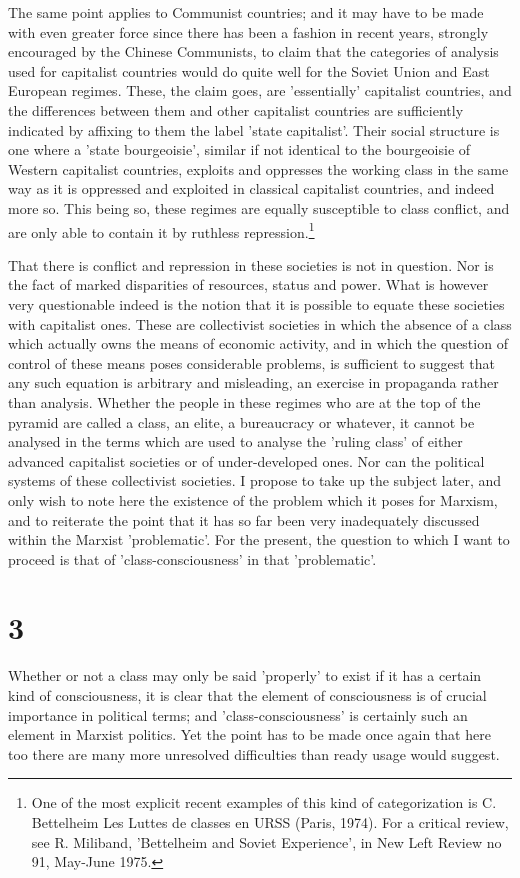 The same point applies to Communist countries; and it may have to be made with even greater force since there has been a fashion in recent years, strongly encouraged by the Chinese Communists, to claim that the categories of analysis used for capitalist countries would do quite well for the Soviet Union and East European regimes. These, the claim goes, are 'essentially' capitalist countries, and the differences between them and other capitalist countries are sufficiently indicated by affixing to them the label 'state capitalist'. Their social structure is one where a 'state bourgeoisie', similar if not identical to the bourgeoisie of Western capitalist countries, exploits and oppresses the working class in the same way as it is oppressed and exploited in classical capitalist countries, and indeed more so. This being so, these regimes are equally susceptible to class conflict, and are only able to contain it by ruthless repression.\footnote{One of the most explicit recent examples of this kind of categorization is C. Bettelheim Les Luttes de classes en URSS (Paris, 1974). For a critical review, see R. Miliband, 'Bettelheim and Soviet Experience', in New Left Review no 91, May-June 1975.}

That there is conflict and repression in these societies is not in question. Nor is the fact of marked disparities of resources, status and power. What is however very questionable indeed is the notion that it is possible to equate these societies with capitalist ones. These are collectivist societies in which the absence of a class which actually owns the means of economic activity, and in which the question of control of these means poses considerable problems, is sufficient to suggest that any such equation is arbitrary and misleading, an exercise in propaganda rather than analysis. Whether the people in these regimes who are at the top of the pyramid are called a class, an elite, a bureaucracy or whatever, it cannot be analysed in the terms which are used to analyse the 'ruling class' of either advanced capitalist societies or of under-developed ones. Nor can the political systems of these collectivist societies. I propose to take up the subject later, and only wish to note here the existence of the problem which it poses for Marxism, and to reiterate the point that it has so far been very inadequately discussed within the Marxist 'problematic'. For the present, the question to which I want to proceed is that of 'class-consciousness' in that 'problematic'.

\section*{3}
Whether or not a class may only be said 'properly' to exist if it has a certain kind of consciousness, it is clear that the element of consciousness is of crucial importance in political terms; and 'class-consciousness' is certainly such an element in Marxist politics. Yet the point has to be made once again that here too there are many more unresolved difficulties than ready usage would suggest.

